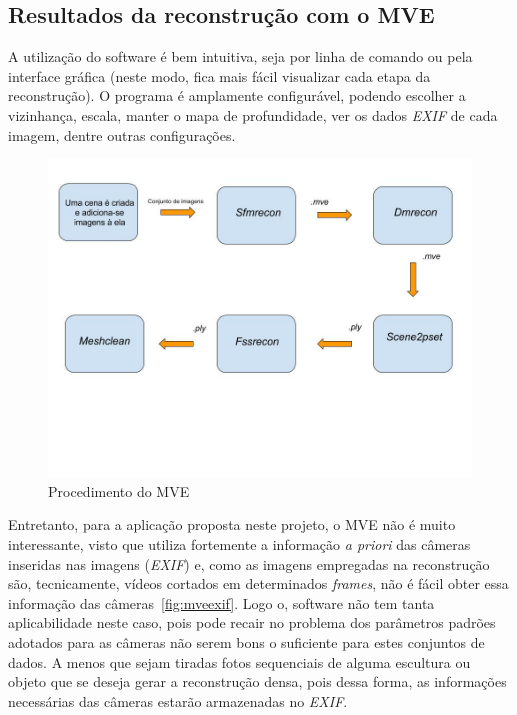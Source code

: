 
\subsection{Resultados da reconstrução com o MVE}

A utilização do software é bem intuitiva, seja por linha de comando ou pela
interface gráfica (neste modo, fica mais fácil visualizar cada etapa da
reconstrução). O programa é amplamente configurável, podendo escolher a vizinhança, escala,
manter o mapa de profundidade, ver os dados \emph{EXIF} de cada imagem, dentre
outras configurações.

\newpage

\begin{figure}[!htpb]
	\centering
	\caption{Procedimento do MVE}
	\includegraphics[width=0.5\linewidth]{figs/pipelineMVE.jpg}
\end{figure}

Entretanto, para a aplicação proposta neste projeto, o MVE não é muito interessante,
visto que utiliza fortemente a informação \emph{a priori} das câmeras inseridas nas imagens
(\emph{EXIF}) e, como as imagens empregadas na reconstrução são, tecnicamente,
vídeos cortados em determinados \emph{frames}, não é fácil obter essa informação
das câmeras~\ref{fig:mveexif}. Logo o, software não tem tanta aplicabilidade
neste caso, pois pode recair no problema dos parâmetros padrões adotados para as
câmeras não serem bons o suficiente para estes conjuntos de dados. A menos que
sejam tiradas fotos sequenciais de alguma escultura ou objeto que se deseja
gerar a reconstrução densa, pois dessa forma, as informações necessárias das
câmeras estarão armazenadas no \emph{EXIF}. 

